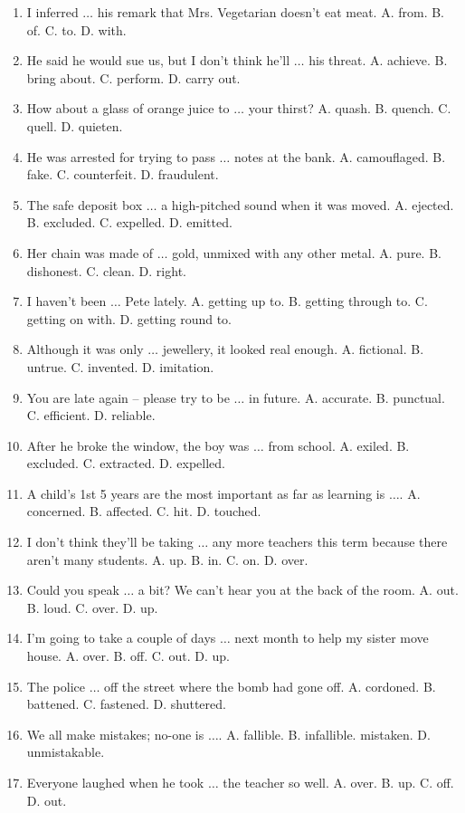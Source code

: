 \documentclass{article}
\numberwithin{equation}{section}
\begin{document}
\begin{enumerate}[leftmargin=5mm]
	\item I inferred $\ldots$ his remark that Mrs. Vegetarian doesn't eat meat. A. from. B. of. C. to. D. with.
	\item He said he would sue us, but I don't think he'll $\ldots$ his threat. A. achieve. B. bring about. C. perform. D. carry out.
	\item How about a glass of orange juice to $\ldots$ your thirst? A. quash. B. quench. C. quell. D. quieten.
	\item He was arrested for trying to pass $\ldots$ notes at the bank. A. camouflaged. B. fake. C. counterfeit. D. fraudulent.
	\item The safe deposit box $\ldots$ a high-pitched sound when it was moved. A. ejected. B. excluded. C. expelled. D. emitted.
	\item Her chain was made of $\ldots$ gold, unmixed with any other metal. A. pure. B. dishonest. C. clean. D. right.
	\item I haven't been $\ldots$ Pete lately. A. getting up  to. B. getting through to. C. getting on with. D. getting round to.
	\item Although it was only $\ldots$ jewellery, it looked real enough. A. fictional. B. untrue. C. invented. D. imitation.
	\item You are late again -- please try to be $\ldots$ in future. A. accurate. B. punctual. C. efficient. D. reliable.
	\item After he broke the window, the boy was $\ldots$ from school. A. exiled. B. excluded. C. extracted. D. expelled.
	\item A child's 1st 5 years are the most important as far as learning is $\ldots$. A. concerned. B. affected. C. hit. D. touched.
	\item I don't think they'll be taking $\ldots$ any more teachers this term because there aren't many students. A. up. B. in. C. on. D. over.
	\item Could you speak $\ldots$ a bit? We can't hear you at the back of the room. A. out. B. loud. C. over. D. up.
	\item I'm going to take a couple of days $\ldots$ next month to help my sister move house. A. over. B. off. C. out. D. up.
	\item The police $\ldots$ off the street where the bomb had gone off. A. cordoned. B. battened. C. fastened. D. shuttered.
	\item We all make mistakes; no-one is $\ldots$. A. fallible. B. infallible. mistaken. D. unmistakable.
	\item Everyone laughed when he took $\ldots$ the teacher so well. A. over. B. up. C. off. D. out.

\end{enumerate}
\end{document}
